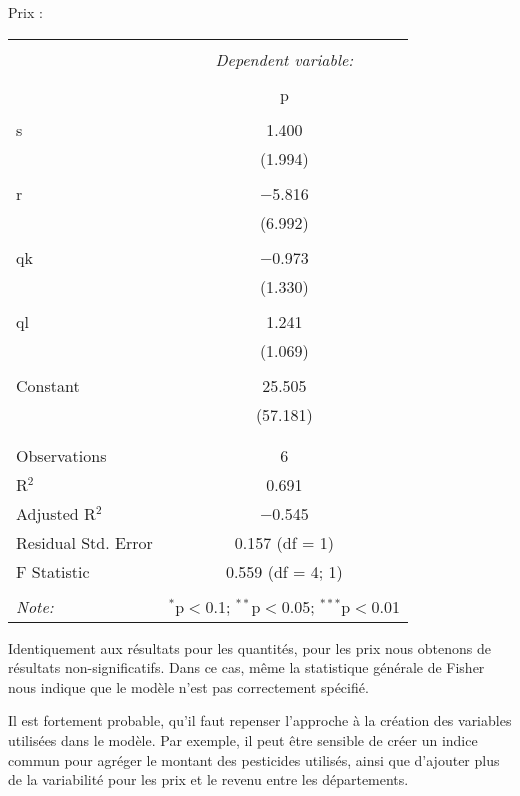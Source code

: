\documentclass[11pt, a4paper]{article}
\begin{document}
\newpage
Prix :
\FloatBarrier
\begin{center}
\begin{tabular}{@{\extracolsep{5pt}}lc} 
\\[-1.8ex]\hline 
\hline \\[-1.8ex] 
 & \multicolumn{1}{c}{\textit{Dependent variable:}} \\ 
\cline{2-2}
\\[-1.8ex] & p \\ 
\hline \\[-1.8ex] 
 s & 1.400 \\ 
  & (1.994) \\ 
  & \\ 
 r & $-$5.816 \\ 
  & (6.992) \\ 
  & \\
 qk & $-$0.973 \\ 
  & (1.330) \\ 
  & \\
 ql & 1.241 \\ 
  & (1.069) \\ 
  & \\ 
 Constant & 25.505 \\ 
  & (57.181) \\ 
  & \\ 
\hline \\[-1.8ex] 
Observations & 6 \\ 
R$^{2}$ & 0.691 \\ 
Adjusted R$^{2}$ & $-$0.545 \\ 
Residual Std. Error & 0.157 (df = 1) \\ 
F Statistic & 0.559 (df = 4; 1) \\ 
\hline 
\hline \\[-1.8ex] 
\textit{Note:}  & \multicolumn{1}{r}{$^{*}$p$<$0.1; $^{**}$p$<$0.05; $^{***}$p$<$0.01} 
\\ 
\end{tabular}
\end{center}
\FloatBarrier
Identiquement aux résultats pour les quantités, pour les prix nous obtenons de résultats non-significatifs. 
Dans ce cas, même la statistique générale de Fisher nous indique que le modèle n'est pas correctement spécifié. 
\par
Il est fortement probable, qu'il faut repenser l'approche à la création des variables utilisées dans le modèle.
Par exemple, il peut être sensible de créer un indice commun pour agréger le montant des pesticides utilisés, ainsi que d'ajouter plus de la variabilité pour les prix et le revenu entre les départements. 
\end{document}

